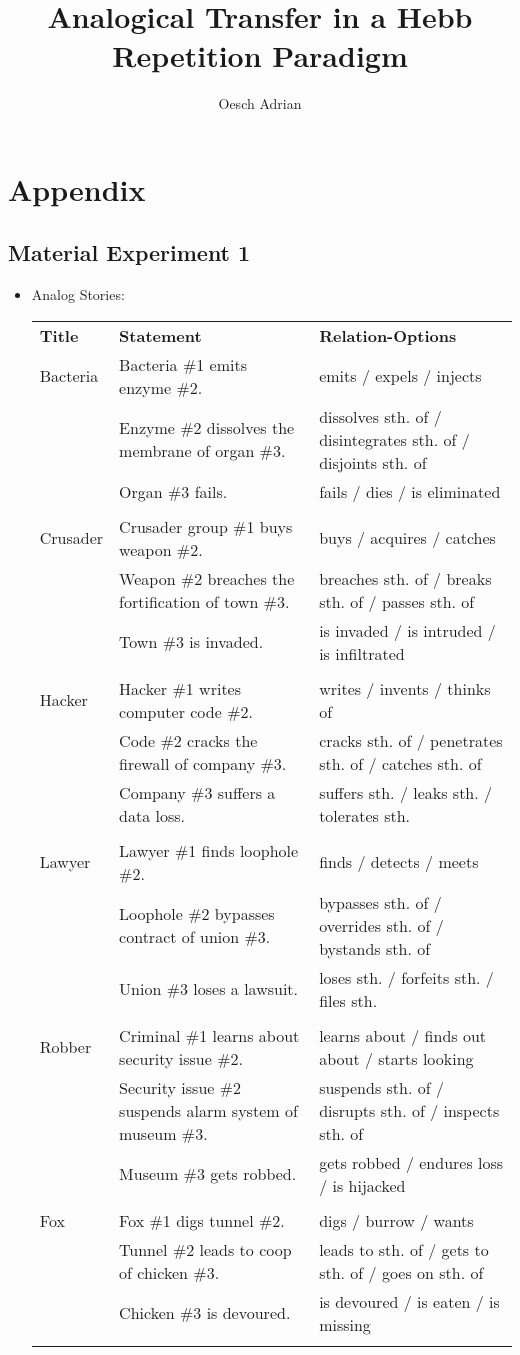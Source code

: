 \documentclass[a4paper,man,natbib,floatsintext,import]{apa6}
\title{Analogical Transfer in a Hebb Repetition Paradigm}
\author{Oesch Adrian}
\affiliation{University of Zurich}
\begin{document}
\section{Appendix}
\subsection{Material Experiment 1}


\begin{itemize}
\item Analog Stories:
\scriptsize
\begin{longtable}{p{}p{}p{}}
\textbf{Title} & \textbf{Statement} &\textbf{Relation-Options}\\
Bacteria & Bacteria \#1 emits enzyme \#2. & emits / expels / injects \\   & Enzyme \#2 dissolves the membrane of organ \#3. & dissolves sth. of / disintegrates sth. of / disjoints sth. of \\   & Organ \#3 fails. & fails / dies / is eliminated \\  & & \\ Crusader & Crusader group \#1 buys weapon \#2. & buys / acquires / catches \\   & Weapon \#2 breaches the fortification of town \#3. & breaches sth. of / breaks sth. of / passes sth. of \\   & Town \#3 is invaded. & is invaded / is intruded / is infiltrated \\  & & \\ Hacker & Hacker \#1 writes computer code \#2. & writes / invents / thinks of \\   & Code \#2 cracks the firewall of company \#3. & cracks sth. of / penetrates sth. of / catches sth. of \\   & Company \#3 suffers a data loss. & suffers sth. / leaks sth. / tolerates sth. \\  & & \\ Lawyer & Lawyer \#1 finds loophole \#2. & finds / detects / meets \\   & Loophole \#2 bypasses contract of union \#3. & bypasses sth. of / overrides sth. of / bystands sth. of \\   & Union \#3 loses a lawsuit. & loses sth. / forfeits sth. / files sth. \\  & & \\ Robber & Criminal \#1 learns about security issue \#2. & learns about / finds out about / starts looking \\   & Security issue \#2 suspends alarm system of museum \#3. & suspends sth. of / disrupts sth. of / inspects sth. of \\   & Museum \#3 gets robbed. & gets robbed / endures loss / is hijacked \\  & & \\ Fox & Fox \#1 digs tunnel \#2. & digs / burrow / wants \\   & Tunnel \#2 leads to coop of chicken \#3. & leads to sth. of / gets to sth. of / goes on sth. of \\   & Chicken \#3 is devoured. & is devoured / is eaten / is missing \\  & & \\

\end{longtable}
\end{itemize}
\end{document}
